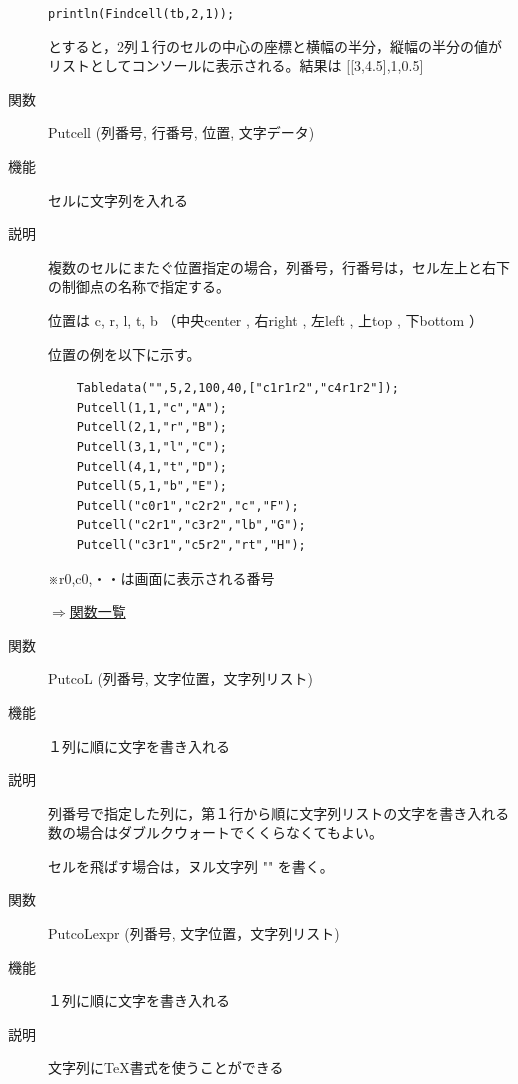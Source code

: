 \documentclass[papersize,a4paper,12pt,uplatex]{jsarticle}
\begin{document}
\begin{description}
    \verb|println(Findcell(tb,2,1));|
    
    とすると，2列１行のセルの中心の座標と横幅の半分，縦幅の半分の値がリストとしてコンソールに表示される。結果は [[3,4.5],1,0.5]

\vspace{\baselineskip}
\hypertarget{putcell}{}
\item[関数]  Putcell (列番号, 行番号, 位置, 文字データ)
\item[機能]  セルに文字列を入れる
\item[説明]  複数のセルにまたぐ位置指定の場合，列番号，行番号は，セル左上と右下の制御点の名称で指定する。

位置は  c, r, l, t, b （中央center , 右right , 左left , 上top , 下bottom   ）
  
位置の例を以下に示す。
\begin{verbatim}
    Tabledata("",5,2,100,40,["c1r1r2","c4r1r2"]);
    Putcell(1,1,"c","A");
    Putcell(2,1,"r","B");
    Putcell(3,1,"l","C");
    Putcell(4,1,"t","D");
    Putcell(5,1,"b","E");
    Putcell("c0r1","c2r2","c","F");
    Putcell("c2r1","c3r2","lb","G");
    Putcell("c3r1","c5r2","rt","H");
\end{verbatim}
\vspace{\baselineskip}
      \begin{center}  \end{center}

  ※r0,c0,・・は画面に表示される番号

\begin{flushright}  \hyperlink{functionlist}{$\Rightarrow$関数一覧}\end{flushright}

\vspace{\baselineskip}
\hypertarget{putcol}{}
\item[関数]  PutcoL (列番号, 文字位置，文字列リスト)
\item[機能]  １列に順に文字を書き入れる
\item[説明]  列番号で指定した列に，第１行から順に文字列リストの文字を書き入れる\\
  数の場合はダブルクウォートでくくらなくてもよい。
  
  セルを飛ばす場合は，ヌル文字列 "" を書く。
  
\vspace{\baselineskip}
\hypertarget{putcolexpr}{}
\item[関数]  PutcoLexpr (列番号, 文字位置，文字列リスト)
\item[機能]  １列に順に文字を書き入れる
\item[説明]  文字列に\TeX 書式を使うことができる


\end{description}
\end{document}
